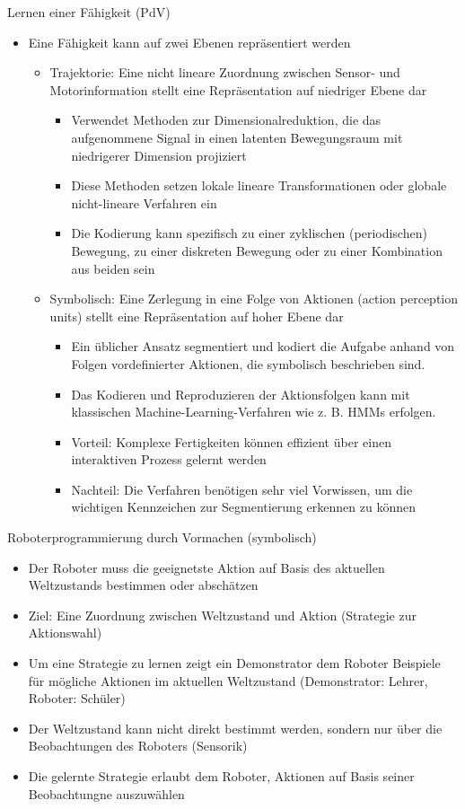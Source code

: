 \documentclass[paper=a4, fontsize=11pt]{scrartcl} %
\numberwithin{equation}{section} %
\numberwithin{figure}{section} %
\numberwithin{table}{section} %
\begin{document}
Lernen einer Fähigkeit (PdV)
\begin{itemize}
\item Eine Fähigkeit kann auf zwei Ebenen repräsentiert werden
\begin{itemize}
\item Trajektorie: Eine nicht lineare Zuordnung zwischen Sensor- und Motorinformation stellt eine Repräsentation auf niedriger Ebene dar
\begin{itemize}
\item Verwendet Methoden zur Dimensionalreduktion, die das aufgenommene Signal in einen latenten Bewegungsraum mit niedrigerer Dimension projiziert
\item Diese Methoden setzen lokale lineare Transformationen oder globale nicht-lineare Verfahren ein
\item Die Kodierung kann spezifisch zu einer zyklischen (periodischen) Bewegung, zu einer diskreten Bewegung oder zu einer Kombination aus beiden sein
\end{itemize}
\item Symbolisch: Eine Zerlegung in eine Folge von Aktionen (action perception units) stellt eine Repräsentation auf hoher Ebene dar
\begin{itemize}
\item Ein üblicher Ansatz segmentiert und kodiert die Aufgabe anhand von Folgen vordefinierter Aktionen, die symbolisch beschrieben sind.
\item Das Kodieren und Reproduzieren der Aktionsfolgen kann mit klassischen Machine-Learning-Verfahren wie z. B. HMMs erfolgen.
\item Vorteil: Komplexe Fertigkeiten können effizient über einen interaktiven Prozess gelernt werden
\item Nachteil: Die Verfahren benötigen sehr viel Vorwissen, um die wichtigen Kennzeichen zur Segmentierung erkennen zu können
\end{itemize}
\end{itemize}
\end{itemize}

Roboterprogrammierung durch Vormachen (symbolisch)
\begin{itemize}
\item Der Roboter muss die geeignetste Aktion auf Basis des aktuellen Weltzustands bestimmen oder abschätzen
\item Ziel: Eine Zuordnung zwischen Weltzustand und Aktion (Strategie zur Aktionswahl)
\item Um eine Strategie zu lernen zeigt ein Demonstrator dem Roboter Beispiele für mögliche Aktionen im aktuellen Weltzustand (Demonstrator: Lehrer, Roboter: Schüler)
\item Der Weltzustand kann nicht direkt bestimmt werden, sondern nur über die Beobachtungen des Roboters (Sensorik)
\item Die gelernte Strategie erlaubt dem Roboter, Aktionen auf Basis seiner Beobachtungne auszuwählen
\end{itemize}
\end{document}

